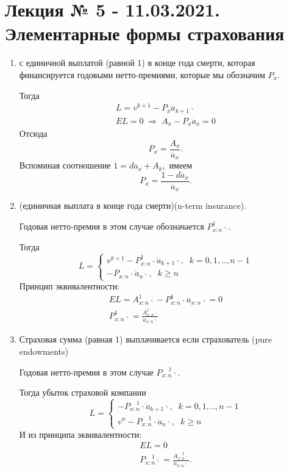 \chapter{Лекция № 5 - 11.03.2021. Элементарные формы страхования} %
\begin{enumerate}
	\item {} с единичной выплатой (равной 1) в конце года смерти, которая финансируется годовыми нетто-премиями, которые мы обозначим $ P_x.$

	Тогда
	\begin{gather*}
		L = v^{k+1}-P_x \ddot{a}_{k+1\urcorner}\\
		EL = 0 \; \Rightarrow \; A_x - P_x \ddot{a}_x = 0 
	\end{gather*}
	Отсюда
	\[ P_x = \frac{A_x}{\ddot{a}_x}. \]
	Вспоминая соотношение $ 1 = d \ddot{a}_x + A_k,$ имеем
	\[P_x = \frac{1-d\ddot{a}_x}{\ddot{a}_x}.\]

	\item {} (единичная выплата в конце года смерти)(n-term insurance).

	Годовая нетто-премия в этом случае обозначается $ P_{x:n\urcorner}^{1}.$

	Тогда
	\[
		L=\begin{cases}
			v^{k+1} - P_{x:n\urcorner}^{1} \ddot{a}_{k+1\urcorner}, \;\; k = 0,1,.., n-1\\
			- P_{x:n\urcorner} \ddot{a}_{n\urcorner}, \;\; k \geq n
		\end{cases}
	\]
	Принцип эквивалентности:
	\begin{gather*}
		EL = A_{x:n\urcorner}^{1} - P_{x:n\urcorner}^{1} \ddot{a}_{x:n\urcorner} = 0\\
		P_{x:n\urcorner}^{1} = \frac{A_{x:n\urcorner}^{1}}{\ddot{a}_{x:n\urcorner}}
	\end{gather*}

	\item Страховая сумма (равная 1) выплачивается  если страхователь  (pure endowments)

	Годовая нетто-премия в этом случае $ P_{x:n\urcorner}^{\;\;\;\;1}.$

	Тогда убыток страховой компании
	\[
		L=\begin{cases}
			-P_{x:n\urcorner}^{\;\;\;\;1}\ddot{a}_{k+1\urcorner}, \;\; k=0,1,..,n-1\\
			v^n-P_{x:n\urcorner}^{\;\;\;\;1}\ddot{a}_{n\urcorner}, \;\; k \geq n
		\end{cases}
	\]
	И из принципа эквивалентности:
	\begin{gather*}
		EL = 0\\
		P_{x:n\urcorner}^{\;\;\;\;1} = \frac{A_{x:n\urcorner}^{\;\;\;\;1}}{\ddot{a}_{x:n\urcorner}}.
	\end{gather*}


\end{enumerate}
